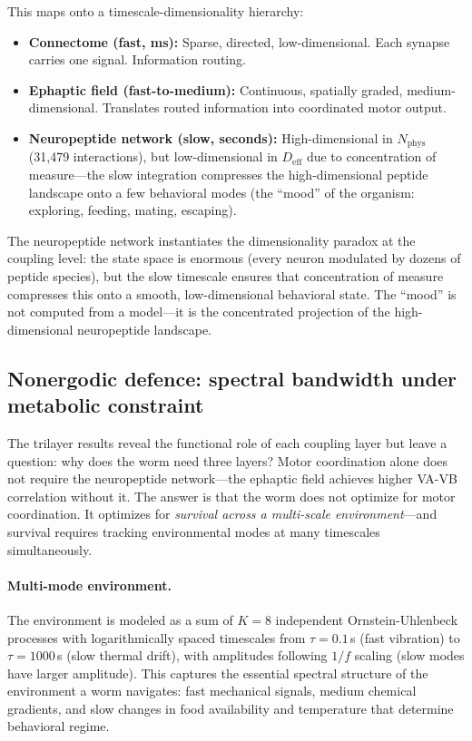 \documentclass[12pt]{article}
\newcommand{\Deff}{D_{\mathrm{eff}}}
\begin{document}
This maps onto a timescale-dimensionality hierarchy:
\begin{itemize}
\item \textbf{Connectome (fast, ms):} Sparse, directed, low-dimensional. Each synapse carries one signal. Information routing.
\item \textbf{Ephaptic field (fast-to-medium):} Continuous, spatially graded, medium-dimensional. Translates routed information into coordinated motor output.
\item \textbf{Neuropeptide network (slow, seconds):} High-dimensional in $N_{\mathrm{phys}}$ (31{,}479 interactions), but low-dimensional in $\Deff$ due to concentration of measure---the slow integration compresses the high-dimensional peptide landscape onto a few behavioral modes (the ``mood'' of the organism: exploring, feeding, mating, escaping).
\end{itemize}

\noindent The neuropeptide network instantiates the dimensionality paradox at the coupling level: the state space is enormous (every neuron modulated by dozens of peptide species), but the slow timescale ensures that concentration of measure compresses this onto a smooth, low-dimensional behavioral state. The ``mood'' is not computed from a model---it is the concentrated projection of the high-dimensional neuropeptide landscape.


\subsection{Nonergodic defence: spectral bandwidth under metabolic constraint}
\label{sec:spectral}

The trilayer results reveal the functional role of each coupling layer but leave a question: why does the worm need three layers? Motor coordination alone does not require the neuropeptide network---the ephaptic field achieves higher VA-VB correlation without it. The answer is that the worm does not optimize for motor coordination. It optimizes for \textit{survival across a multi-scale environment}---and survival requires tracking environmental modes at many timescales simultaneously.

\paragraph{Multi-mode environment.} The environment is modeled as a sum of $K = 8$ independent Ornstein-Uhlenbeck processes with logarithmically spaced timescales from $\tau = 0.1$\,s (fast vibration) to $\tau = 1000$\,s (slow thermal drift), with amplitudes following $1/f$ scaling (slow modes have larger amplitude). This captures the essential spectral structure of the environment a worm navigates: fast mechanical signals, medium chemical gradients, and slow changes in food availability and temperature that determine behavioral regime.
\end{document}
